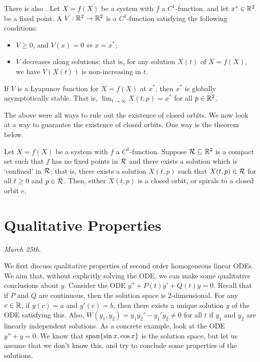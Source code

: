 There is also . Let $\dot{X} = f(X)$ be a system with $f$ a $C^{1}$-function, and let $x^{\ast} \in \mathbb{R}^{2}$ be a fixed point. A  $V: \mathbb{R}^{2} \to \mathbb{R}^{2}$ is a $C^{1}$-function satisfying the following conditions:
\begin{itemize}
    \item $V \geq 0$, and $V(x) = 0 \iff x = x^{\ast}$;
    \item $V$ decreases along solutions; that is, for any solution $X(t)$ of $\dot{X} = f(X)$, we have $V(X(t))$ is non-increasing in $t$.
\end{itemize}
\begin{theorem}
    If $V$ is a Lyapunov function for $\dot{X} = f(X)$ at $x^{\ast}$, then $x^{\ast}$ is globally asymptotically stable. That is, $\lim_{t \to \infty} X(t,p) = x^{\ast}$ for all $p \in \mathbb{R}^{2}$.
\end{theorem}

The above were all ways to rule out the existence of closed orbits. We now look at a way to guarantee the existence of closed orbits. One way is the theorem below.

\begin{theorem}
    Let $\dot{X} = f(X)$ be a system with $f$ a $C^{1}$-function. Suppose $\mathcal{R} \subseteq \mathbb{R}^{2}$ is a compact set such that $f$ has no fixed points in $\mathcal{R}$ and there exists a solution which is `confined' in $\mathcal{R}$; that is, there exists a solution $X(t,p)$ such that $X(t,p) \in \mathcal{R}$ for all $t \geq 0$ and $p \in \mathcal{R}$. Then, either $X(t,p)$ is a closed orbit, or spirals to a closed orbit $e$.
\end{theorem}

\section{Qualitative Properties}
\textit{March 25th.}

We first discuss qualitative properties of second order homogeneous linear ODEs. We aim that, without explicitly solving the ODE, we can make some qualitative conclusions about $y$. Consider the ODE $y'' + P(t) y' + Q(t) y = 0$. Recall that if $P$ and $Q$ are continuous, then the solution space is 2-dimensional. For any $c \in \mathbb{R}$, if $y(c) = a$ and $y'(c) = b$, then there exists a unique solution $y$ of the ODE satisfying this. Also, $W(y_{1},y_{2}) = y_{1} y_{2}' - y_{1}' y_{2} \neq 0$ for all $t$ if $y_{1}$ and $y_{2}$ are linearly independent solutions. As a concrete example, look at the ODE $y'' + y = 0$. We know that $\operatorname{span} \{\sin x, \cos x\}$ is the solution space, but let us assume that we don't know this, and try to conclude some properties of the solutions.

